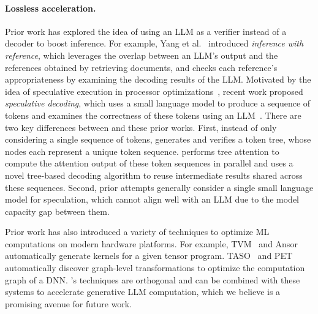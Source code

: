 \paragraph{Lossless acceleration.}
Prior work has explored the idea of using an LLM as a verifier instead of a decoder to boost inference.
For example, Yang et al.~\cite{yang2023inference} introduced {\em inference with reference}, which leverages the overlap between an LLM's output and the references obtained by retrieving documents, and checks each reference's appropriateness by examining the decoding results of the LLM.
Motivated by the idea of speculative execution in processor optimizations~\cite{burton1985speculative, hennessy2011computer}, recent work proposed {\em speculative decoding}, which uses a small language model to produce a sequence of tokens and examines the correctness of these tokens using an LLM~\cite{leviathan2022fast, xiaspeculative, stern2018blockwise, chen2023accelerating, gante2023assisted}.
There are two key differences between \Sys and these prior works.
First, instead of only considering a single sequence of tokens, \Sys generates and verifies a token tree, whose nodes each represent a unique token sequence. \Sys performs tree attention to compute the attention output of these token sequences in parallel and uses a novel tree-based decoding algorithm to reuse intermediate results shared across these sequences.
Second, prior attempts generally consider a single small language model for speculation, which cannot align well with an LLM due to the model capacity gap between them.

Prior work has also introduced a variety of techniques to optimize ML computations on modern hardware platforms. 
For example, TVM~\cite{chen2018tvm} and Ansor~\cite{zheng2020ansor} automatically generate kernels for a given tensor program. TASO~\cite{jia2019taso} and PET~\cite{wang2021pet} automatically discover graph-level transformations to optimize the computation graph of a DNN.
\Sys's techniques are orthogonal and can be combined with these systems to accelerate generative LLM computation, which we believe is a promising avenue for future work.

